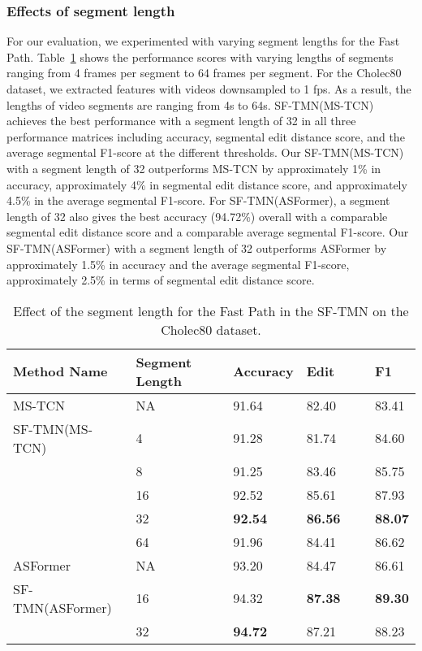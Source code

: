 \documentclass[sn-mathphys,Numbered]{sn-jnl}
\theoremstyle{thmstyleone}\newtheorem{theorem}{Theorem}\newtheorem{proposition}[theorem]{Proposition}
\theoremstyle{thmstyletwo}\newtheorem{example}{Example}\newtheorem{remark}{Remark}
\theoremstyle{thmstylethree}\newtheorem{definition}{Definition}
\begin{document}
\subsubsection{Effects of segment length} For our evaluation, we experimented with varying segment lengths for the Fast Path. Table~\ref{tab3} shows the performance scores with varying lengths of segments ranging from 4 frames per segment to 64 frames per segment. For the Cholec80 dataset, we extracted features with videos downsampled to 1 fps. As a result, the lengths of video segments are ranging from 4s to 64s. SF-TMN(MS-TCN) achieves the best performance with a segment length of 32 in all three performance matrices including accuracy, segmental edit distance score, and the average segmental F1-score at the different thresholds. Our SF-TMN(MS-TCN) with a segment length of 32 outperforms MS-TCN by approximately 1\% in accuracy, approximately 4\% in segmental edit distance score, and approximately 4.5\% in the average segmental F1-score.
For SF-TMN(ASFormer), a segment length of 32 also gives the best accuracy (94.72\%) overall with a comparable segmental edit distance score and a comparable average segmental F1-score. Our SF-TMN(ASFormer) with a segment length of 32 outperforms ASFormer by approximately 1.5\% in accuracy and the average segmental F1-score, approximately 2.5\% in terms of segmental edit distance score.


\begin{table}[h]
\centering
\caption{Effect of the segment length for the Fast Path in the SF-TMN on the Cholec80 dataset.}\label{tab3}
\begin{tabular}{lllll}
\hline
Method Name &  Segment Length & Accuracy & Edit & F1\\
\hline
{MS-TCN} & NA & 91.64    &82.40    &83.41 \\
\hline
{SF-TMN(MS-TCN)} & 4 & 91.28 & 81.74 & 84.60 \\
                & 8 & 91.25 & 83.46 & 85.75 \\
                & 16 & 92.52 & 85.61 & 87.93 \\
                & 32 & \textbf{92.54} & \textbf{86.56} & \textbf{88.07} \\
                & 64 & 91.96 & 84.41 & 86.62 \\
\hline
{ASFormer} & NA & 93.20    &84.47    &86.61 \\
\hline
{SF-TMN(ASFormer)} & 16 & 94.32 & \textbf{87.38} & \textbf{89.30} \\
                & 32 & \textbf{94.72} & 87.21 &  88.23 \\
\hline
\end{tabular}
\end{table}
\end{document}
